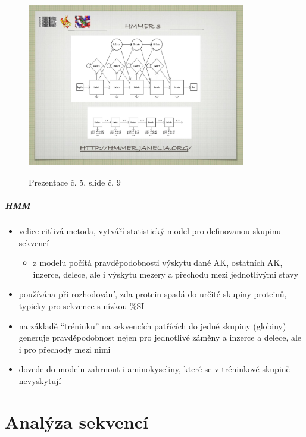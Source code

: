 \documentclass[DIV=8]{scrreprt}
\begin{document}
\begin{figure}
    \caption{Prezentace č. 5, slide č. 9}
    \includegraphics[width=0.85\textwidth]{slides-5/slide-9.jpg}
    \centering
    \label{slides-5-slide-9}
\end{figure}

\paragraph{HMM}
\begin{itemize}[nosep]
    \item velice citlivá metoda, vytváří statistický model pro definovanou skupinu sekvencí
\begin{itemize}[nosep]
    \item z modelu počítá pravděpodobnosti výskytu dané AK, ostatních AK, inzerce, delece, ale i výskytu mezery a přechodu mezi jednotlivými stavy
\end{itemize}

    \item používána při rozhodování, zda protein spadá do určité skupiny proteinů, typicky pro sekvence s nízkou \%SI
    \item na základě “tréninku” na sekvencích patřících do jedné skupiny (globiny) generuje pravděpodobnost nejen pro jednotlivé záměny a inzerce a delece, ale i pro přechody mezi nimi
    \item dovede do modelu zahrnout i aminokyseliny, které se v tréninkové skupině nevyskytují
\end{itemize}



\chapter{Analýza sekvencí} \label{Analýza sekvencí}
\end{document}
